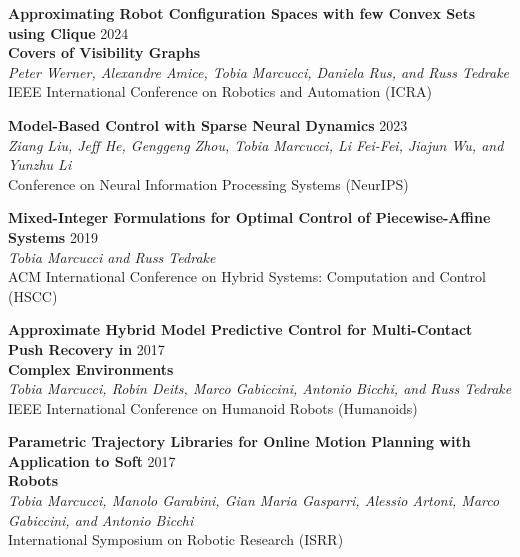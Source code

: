 \documentclass[11pt,a4paper,sans]{moderncv}
\begin{document}
\begin{enumerate}[label={[C\arabic*]}]
\item \textbf{Approximating Robot Configuration Spaces with few Convex Sets using Clique} \hfill 2024 \\ \textbf{Covers of Visibility Graphs}  \\
\textit{Peter Werner, Alexandre Amice, Tobia Marcucci, Daniela Rus, and Russ Tedrake} \\
IEEE International Conference on Robotics and Automation (ICRA)


\item \textbf{Model-Based Control with Sparse Neural Dynamics} \hfill 2023 \\
\textit{Ziang Liu, Jeff He, Genggeng Zhou, Tobia Marcucci, Li Fei-Fei, Jiajun Wu, and Yunzhu Li} \\
Conference on Neural Information Processing Systems (NeurIPS)

\item \textbf{Mixed-Integer Formulations for Optimal Control of Piecewise-Affine Systems} \hfill 2019 \\
\textit{Tobia Marcucci and Russ Tedrake} \\
ACM International Conference on Hybrid Systems: Computation and Control (HSCC)

\item \textbf{Approximate Hybrid Model Predictive Control for Multi-Contact Push Recovery in} \hfill 2017 \\ \textbf{Complex Environments} \\
\textit{Tobia Marcucci, Robin Deits, Marco Gabiccini, Antonio Bicchi, and Russ Tedrake} \\
IEEE International Conference on Humanoid Robots (Humanoids)

\item \textbf{Parametric Trajectory Libraries for Online Motion Planning with Application to Soft} \hfill 2017 \\ \textbf{Robots}  \\
\textit{Tobia Marcucci, Manolo Garabini, Gian Maria Gasparri, Alessio Artoni, Marco Gabiccini, and Antonio Bicchi} \\
International Symposium on Robotic Research (ISRR)


\end{enumerate}
\end{document}
